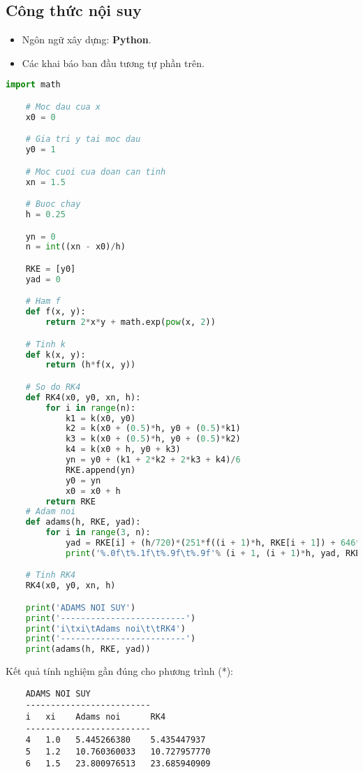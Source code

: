 \subsection{Công thức nội suy}
\begin{itemize}
	\item Ngôn ngữ xây dựng: \textbf{Python}.
	\item Các khai báo ban đầu tương tự phần trên.
\end{itemize}
\begin{lstlisting}[language=Python]
	import math

	# Moc dau cua x
	x0 = 0

	# Gia tri y tai moc dau
	y0 = 1

	# Moc cuoi cua doan can tinh
	xn = 1.5

	# Buoc chay
	h = 0.25

	yn = 0
	n = int((xn - x0)/h)

	RKE = [y0]
	yad = 0

	# Ham f
	def f(x, y):
	    return 2*x*y + math.exp(pow(x, 2))

	# Tinh k
	def k(x, y):
		return (h*f(x, y))

	# So do RK4
	def RK4(x0, y0, xn, h):
	    for i in range(n):
	        k1 = k(x0, y0)
	        k2 = k(x0 + (0.5)*h, y0 + (0.5)*k1)
	        k3 = k(x0 + (0.5)*h, y0 + (0.5)*k2)
	        k4 = k(x0 + h, y0 + k3)
	        yn = y0 + (k1 + 2*k2 + 2*k3 + k4)/6
	        RKE.append(yn)
	        y0 = yn
	        x0 = x0 + h
	    return RKE
	# Adam noi
	def adams(h, RKE, yad):
		for i in range(3, n):
			yad = RKE[i] + (h/720)*(251*f((i + 1)*h, RKE[i + 1]) + 646*f(i*h, RKE[i]) - 264*f((i - 1)*h, RKE[i - 1]) + 106*f((i - 2)*h, RKE[i - 2]) - 19*f((i - 3)*h, RKE[i - 3]))
			print('%.0f\t%.1f\t%.9f\t%.9f'% (i + 1, (i + 1)*h, yad, RKE[i + 1]))

	# Tinh RK4
	RK4(x0, y0, xn, h)

	print('ADAMS NOI SUY')
	print('-------------------------')    
	print('i\txi\tAdams noi\t\tRK4')
	print('-------------------------')
	print(adams(h, RKE, yad))
\end{lstlisting}

Kết quả tính nghiệm gần đúng cho phương trình (*):
\begin{lstlisting}
	ADAMS NOI SUY
	-------------------------
	i   xi    Adams noi      RK4
	-------------------------
	4   1.0   5.445266380    5.435447937
	5   1.2   10.760360033   10.727957770
	6   1.5   23.800976513   23.685940909
\end{lstlisting}

